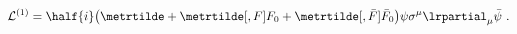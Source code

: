 \begin{equation}
  \label{eq:ord1new}
  \mathcal{L}^{(1)} = \half{i} \bigl(\metrtilde  + \metrtilde[, F] F_0 +
    \metrtilde[, \bar{F}] \bar{F}_0 \bigr) \psi \sigma^\mu \lrpartial_\mu
    \bar{\psi}\ .
\end{equation}

